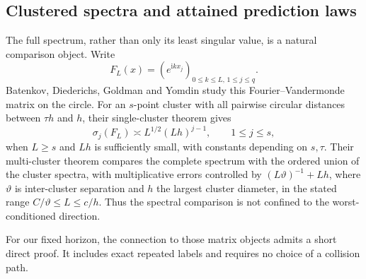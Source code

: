\subsection{Clustered spectra and attained prediction laws}
\label{sec:v35-spectrum}
The full spectrum, rather than only its least singular value, is a
natural comparison object. Write
\[
 F_L(x)=(e^{\mathrm i kx_j})_{0\le k\le L,\,1\le j\le q}.
\]
Batenkov, Diederichs, Goldman and Yomdin
\cite[Theorems 2.2--2.3]{BDGGY2021} study this Fourier--Vandermonde
matrix on the circle. For an $s$-point cluster with all pairwise
circular distances between $\tau h$ and $h$, their single-cluster
theorem gives
\[
 \sigma_j(F_L)\asymp L^{1/2}(Lh)^{j-1},\qquad 1\le j\le s,
\]
when $L\ge s$ and $Lh$ is sufficiently small, with constants depending
on $s,\tau$. Their multi-cluster theorem compares the complete spectrum
with the ordered union of the cluster spectra, with multiplicative
errors controlled by $(L\vartheta)^{-1}+Lh$, where $\vartheta$ is
inter-cluster separation and $h$ the largest cluster diameter, in the
stated range $C/\vartheta\le L\le c/h$. Thus the spectral comparison
is not confined to the worst-conditioned direction.

For our fixed horizon, the connection to those matrix objects admits
a short direct proof. It includes exact repeated labels and requires
no choice of a collision path.

